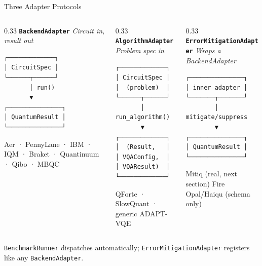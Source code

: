 \documentclass[
  ignorenonframetext,
  aspectratio=169,
]{beamer}
\begin{document}
\begin{frame}[fragile]{Three Adapter Protocols}
\label{three-adapter-protocols}
\footnotesize

\begin{columns}[T]
\begin{column}{0.33\textwidth}
\textbf{\texttt{BackendAdapter}} \emph{Circuit in, result out}

\begin{verbatim}
┌─────────────┐
│ CircuitSpec │
└──────┬──────┘
       │ run()
       ▼
┌───────────────┐
│ QuantumResult │
└───────────────┘
\end{verbatim}

Aer · PennyLane · IBM · IQM · Braket · Quantinuum · Qibo · MBQC
\end{column}

\begin{column}{0.33\textwidth}
\textbf{\texttt{AlgorithmAdapter}} \emph{Problem spec in}

\begin{verbatim}
┌─────────────┐
│ CircuitSpec │
│  (problem)  │
└──────┬──────┘
       │ run_algorithm()
       ▼
┌─────────────┐
│  (Result,   │
│ VQAConfig,  │
│ VQAResult)  │
└─────────────┘
\end{verbatim}

QForte · SlowQuant · generic ADAPT-VQE
\end{column}

\begin{column}{0.33\textwidth}
\textbf{\texttt{ErrorMitigationAdapter}} \emph{Wraps a BackendAdapter}

\begin{verbatim}
┌───────────────┐
│ inner adapter │
└───────┬───────┘
        │ mitigate/suppress
        ▼
┌───────────────┐
│ QuantumResult │
└───────────────┘
\end{verbatim}

Mitiq (real, next section) Fire Opal/Haiqu (schema only)
\end{column}
\end{columns}

\normalsize
\vspace{0.3em}

\texttt{BenchmarkRunner} dispatches automatically;
\texttt{ErrorMitigationAdapter} registers like any
\texttt{BackendAdapter}.
\end{frame}
\end{document}
